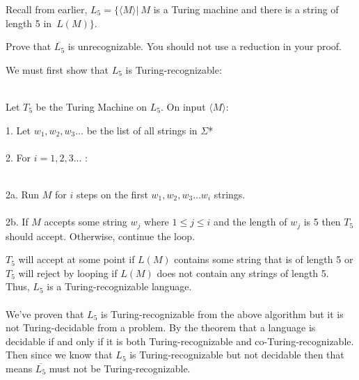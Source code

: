 \documentclass[11pt]{article}
\theoremstyle{definition}
\theoremstyle{theorem}
\newcommand{\solution}{\medskip\noindent{\color{blue}\textbf{Solution:}}}
\begin{document}
Recall from earlier, $L_{5} = \{\langle M \rangle | ~M $  is a Turing machine and there is a string of length 5 in~$ L(M)\}$.

Prove that $\overline{L_{5}}$ is unrecognizable. You should not use a reduction in your proof.



\solution

\noindent We must first show that $L_{5}$ is Turing-recognizable: \\~\\
\hspace*{0.9cm}
\begin{minipage}{1.8\textwidth}
Let $T_{5}$ be the Turing Machine on $L_{5}$. On input $\langle M \rangle$: \\
\hspace*{1.2cm}
\begin{minipage}{1.8\textwidth}
\vspace*{0.5cm}
1. Let $w_{1}, w_{2}, w_{3} ...$ be the list of all strings in $\Sigma$* \\~\\
2. For $i = 1, 2, 3...$ : \\~\\
	\hspace*{0.8cm}
	\begin{minipage}{0.75\textwidth}
	2a. Run $M$ for $i$ steps on the first $w_{1}, w_{2}, w_{3} ... w_{i}$ strings. \\~\\
	2b. If $M$ accepts some string $w_{j}$ where $1 \leq j \leq i$ and the length of $w_{j}$ is 5 then $T_{5}$\\ 
		should accept. Otherwise, continue the loop. \\ 
	\vspace*{0.5cm}	
	\end{minipage}
\end{minipage}
\end{minipage}

\noindent$T_{5}$ will accept at some point if $L(M)$ contains some string that is of length 5 or $T_{5}$ will reject by looping if $L(M)$ does not contain any strings of length 5. Thus, $L_{5}$ is a Turing-recognizable language. \\~\\
We've proven that $L_{5}$ is Turing-recognizable from the above algorithm but it is not Turing-decidable from a problem. By the theorem that a language is decidable if and only if it is both Turing-recognizable and co-Turing-recognizable. Then since we know that $L_{5}$ is Turing-recognizable but not decidable then that means $\overline{L_{5}}$ must not be Turing-recognizable.
\end{document}
